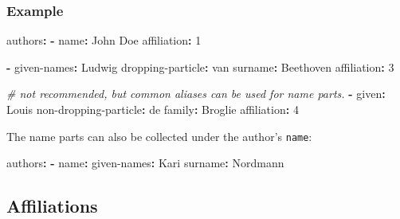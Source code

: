 \documentclass[10pt,a4paper,onecolumn]{article}
\newenvironment{Shaded}{}{}
\newcommand{\AttributeTok}[1]{\textcolor[rgb]{0.49,0.56,0.16}{#1}}
\newcommand{\CommentTok}[1]{\textcolor[rgb]{0.38,0.63,0.69}{\textit{#1}}}
\newcommand{\FunctionTok}[1]{\textcolor[rgb]{0.02,0.16,0.49}{#1}}
\newcommand{\KeywordTok}[1]{\textcolor[rgb]{0.00,0.44,0.13}{\textbf{#1}}}
\newcommand{\StringTok}[1]{\textcolor[rgb]{0.25,0.44,0.63}{#1}}
\begin{document}
\subsubsection{Example}\label{example}

\begin{Shaded}
\begin{Highlighting}[]
\FunctionTok{authors}\KeywordTok{:}
\AttributeTok{  }\KeywordTok{{-}}\AttributeTok{ }\FunctionTok{name}\KeywordTok{:}\AttributeTok{ John Doe}
\AttributeTok{    }\FunctionTok{affiliation}\KeywordTok{:}\AttributeTok{ }\StringTok{\textquotesingle{}1\textquotesingle{}}

\AttributeTok{  }\KeywordTok{{-}}\AttributeTok{ }\FunctionTok{given{-}names}\KeywordTok{:}\AttributeTok{ Ludwig}
\AttributeTok{    }\FunctionTok{dropping{-}particle}\KeywordTok{:}\AttributeTok{ van}
\AttributeTok{    }\FunctionTok{surname}\KeywordTok{:}\AttributeTok{ Beethoven}
\AttributeTok{    }\FunctionTok{affiliation}\KeywordTok{:}\AttributeTok{ }\StringTok{\textquotesingle{}3\textquotesingle{}}

\CommentTok{  \# not recommended, but common aliases can be used for name parts.}
\AttributeTok{  }\KeywordTok{{-}}\AttributeTok{ }\FunctionTok{given}\KeywordTok{:}\AttributeTok{ Louis}
\AttributeTok{    }\FunctionTok{non{-}dropping{-}particle}\KeywordTok{:}\AttributeTok{ de}
\AttributeTok{    }\FunctionTok{family}\KeywordTok{:}\AttributeTok{ Broglie}
\AttributeTok{    }\FunctionTok{affiliation}\KeywordTok{:}\AttributeTok{ }\StringTok{\textquotesingle{}4\textquotesingle{}}
\end{Highlighting}
\end{Shaded}

The name parts can also be collected under the author's \texttt{name}:

\begin{Shaded}
\begin{Highlighting}[]
\FunctionTok{authors}\KeywordTok{:}
\AttributeTok{  }\KeywordTok{{-}}\AttributeTok{ }\FunctionTok{name}\KeywordTok{:}
\AttributeTok{      }\FunctionTok{given{-}names}\KeywordTok{:}\AttributeTok{ Kari}
\AttributeTok{      }\FunctionTok{surname}\KeywordTok{:}\AttributeTok{ Nordmann}
\end{Highlighting}
\end{Shaded}

\subsection{Affiliations}\label{affiliations}
\end{document}
